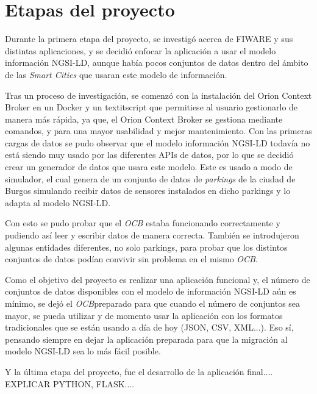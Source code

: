 
\section{Etapas del proyecto}\label{etapas-del-proyecto}

Durante la primera etapa del proyecto, se investigó acerca de FIWARE y sus distintas aplicaciones, y se decidió enfocar la aplicación a usar el modelo información NGSI-LD, aunque había pocos conjuntos de datos dentro del ámbito de las \textit{Smart Cities} que usaran este modelo de información. 

Tras un proceso de investigación, se comenzó con la instalación del Orion Context Broker en un Docker y un textit{script} que permitiese al usuario gestionarlo de manera más rápida, ya que, el Orion Context Broker se gestiona mediante comandos, y para una mayor usabilidad y mejor mantenimiento. 
Con las primeras cargas de datos se pudo observar que el modelo información NGSI-LD todavía no está siendo muy usado por las diferentes APIs de datos, por lo que se decidió crear un generador de datos que usara este modelo. Este es usado a modo de simulador, el cual genera de un conjunto de datos de \textit{parkings} de la ciudad de Burgos simulando recibir datos de sensores instalados en dicho parkings y lo adapta al modelo NGSI-LD. 

Con esto se pudo probar que el \textit{OCB}\footnotemark{} estaba funcionando correctamente y pudiendo así leer y escribir datos de manera correcta. También se introdujeron algunas entidades diferentes, no solo parkings, para probar que los distintos conjuntos de datos podían convivir sin problema en el mismo \textit{OCB}\footnotemark[\value{footnote}]. 

Como el objetivo del proyecto es realizar una aplicación funcional y, el número de conjuntos de datos disponibles con el modelo de información NGSI-LD aún es mínimo, se dejó el \textit{OCB}\footnotemark[\value{footnote}] preparado para que cuando el número de conjuntos sea mayor, se pueda utilizar y de momento usar la aplicación con los formatos tradicionales que se están usando a día de hoy (JSON, CSV, XML...). Eso sí, pensando siempre en dejar la aplicación preparada para que la migración al modelo NGSI-LD sea lo más fácil posible.

Y la última etapa del proyecto, fue el desarrollo de la aplicación final.... EXPLICAR PYTHON, FLASK....

